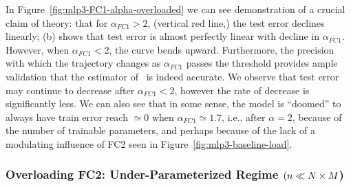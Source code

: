 In Figure~\ref{fig:mlp3-FC1-alpha-overloaded} we can see 
demonstration of a crucial claim of \SETOL theory: that for $\alpha_{FC1} > 2$, (vertical red line,) the test 
error declines linearly; (b) shows that test error is almost perfectly linear with decline in $\alpha_{FC1}$. However, when $\alpha_{FC1} < 2$, the curve bends 
upward. 
Furthermore, the precision with which the trajectory changes as $\alpha_{FC1}$ passes the threshold provides ample 
validation that the estimator of~\cite{CSN09_powerlaw} is indeed accurate. We 
observe that test error may continue to decrease after $\alpha_{FC1} < 2$, however the rate of decrease is significantly less. 
We can also see that in some sense, the model is ``doomed'' to always have train error reach $\simeq 0$ when 
$\alpha_{FC1} \simeq 1.7$, i.e., after $\alpha = 2$, because of the number of trainable parameters, and perhaps because 
of the lack of a modulating influence of FC2 seen in Figure~\ref{fig:mlp3-baseline-load}.




\subsubsection{Overloading FC2: {Under-Parameterized Regime} \texorpdfstring{$(n \ll N\times M$)}{n << NxM}}
\label{sxn:hysteresis_effect_FC2}

